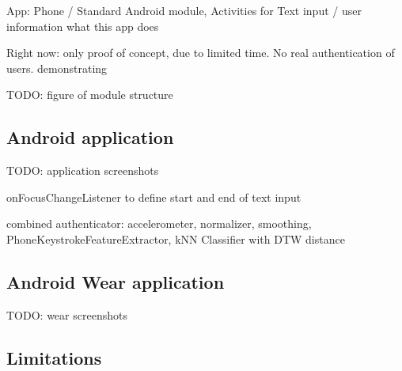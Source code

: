 App: Phone / Standard Android module, Activities for Text input / user information what this app does

Right now: only proof of concept, due to limited time. No real authentication of users. demonstrating 

TODO: figure of module structure

\subsection{Android application}
TODO: application screenshots

onFocusChangeListener to define start and end of text input

combined authenticator: accelerometer, normalizer, smoothing, PhoneKeystrokeFeatureExtractor, kNN Classifier with DTW distance

\subsection{Android Wear application}
TODO: wear screenshots



\subsection{Limitations}